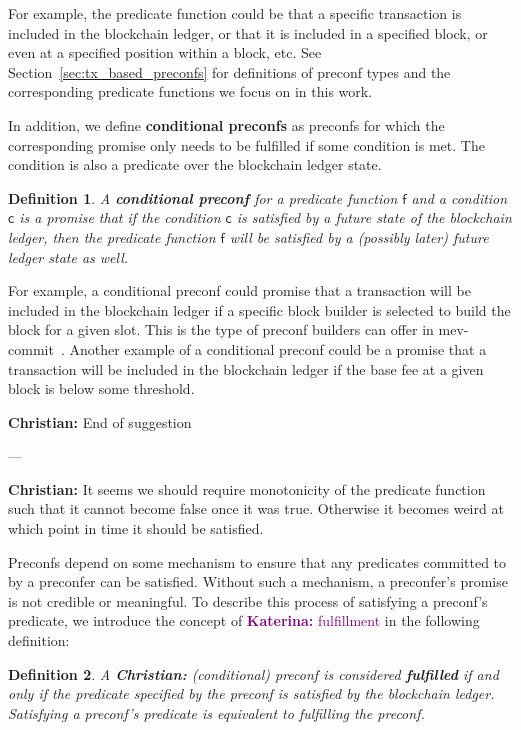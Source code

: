 \documentclass[a4paper]{article}
\theoremstyle{boldstyle}
\newtheorem{definitionx}{Definition}
\newenvironment{definition}
  {\begin{defopenboxq}\begin{definitionx}}
  {\end{definitionx}\end{defopenboxq}}
\newcommand{\ks}[1]{\textcolor{purple}{\textbf{Katerina:} #1}}
\newcommand{\chm}[1]{\textcolor{OliveGreen}{\textbf{Christian:} #1}}
\begin{document}
        For example, the predicate function could be that a specific transaction is included in the blockchain ledger, or that it is included in a specified block, or even at a specified position within a block, etc. See Section~\ref{sec:tx_based_preconfs} for definitions of preconf types and the corresponding predicate functions we focus on in this work.

        In addition, we define \textbf{conditional preconfs} as preconfs for which the corresponding promise only needs to be fulfilled if some condition is met. The condition is also a predicate over the blockchain ledger state.
        
        \begin{definition}
            A \textbf{conditional preconf} for a predicate function $\mathsf{f}$ and a condition $\mathsf{c}$ is a promise that if the condition $\mathsf{c}$ is satisfied by a future state of the blockchain ledger, then the predicate function $\mathsf{f}$ will be satisfied by a (possibly later) future ledger state as well.
        \end{definition}

        For example, a conditional preconf could promise that a transaction will be included in the blockchain ledger if a specific block builder is selected to build the block for a given slot. This is the type of preconf builders can offer in mev-commit~\cite{W:Documentation-Understandingmev-commit}. Another example of a conditional preconf could be a promise that a transaction will be included in the blockchain ledger if the base fee at a given block is below some threshold.

        \chm{End of suggestion}

        ---

        \chm{It seems we should require monotonicity of the predicate function such that it cannot become false once it was true. Otherwise it becomes weird at which point in time it should be satisfied.}
        
         \par
         Preconfs depend on some mechanism to ensure that any predicates committed to by a preconfer can be satisfied. Without such a mechanism, a preconfer's promise is not credible or meaningful. To describe this process of satisfying a preconf's predicate, we introduce the concept of \ks{fulfillment} in the following definition:
     \begin{definition}\label{def:delivery}
    A \chm{(conditional)} preconf is considered \textbf{fulfilled }if and only if the predicate specified by the preconf is satisfied by the blockchain ledger. Satisfying a preconf's predicate is equivalent to fulfilling the preconf.
    \end{definition}
\end{document}
